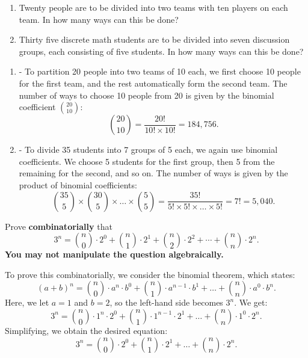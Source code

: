 \documentclass{article}
\theoremstyle{definition}
\begin{document}
\begin{question}
    \begin{enumerate}
	\item Twenty people are to be divided into two teams with ten players on each team.  
	In how many ways can this be done?
        \item Thirty five discrete math students are to be divided into seven discussion groups, each consisting of five students.  
        In how many ways can this be done?
   	\end{enumerate}
\end{question}
\begin{solution}
\begin{enumerate}
    \item 
    - To partition 20 people into two teams of 10 each, we first choose 10 people for the first team, and the rest automatically form the second team. The number of ways to choose 10 people from 20 is given by the binomial coefficient \( \binom{20}{10} \):
    \[ \binom{20}{10} = \frac{20!}{10! \times 10!} = 184,756. \]
    
    \item 
    - To divide 35 students into 7 groups of 5 each, we again use binomial coefficients. We choose 5 students for the first group, then 5 from the remaining for the second, and so on. The number of ways is given by the product of binomial coefficients:
    \[ \binom{35}{5} \times \binom{30}{5} \times \ldots \times \binom{5}{5} = \frac{35!}{5! \times 5! \times \ldots \times 5!} = 7! = 5,040. \]
\end{enumerate}
\end{solution}




\begin{question}
    Prove \textbf{combinatorially} that
    \[ 3^n = \binom{n}{0} \cdot 2^0 + \binom{n}{1}\cdot 2^1+ \binom{n}{2}\cdot 2^2+\cdots +\binom{n}{n}\cdot 2^n. \]
    \textbf{You may not manipulate the question algebraically.}
\end{question}
\begin{solution}
To prove this combinatorially, we consider the binomial theorem, which states:
\[ (a + b)^n = \binom{n}{0} \cdot a^n \cdot b^0 + \binom{n}{1} \cdot a^{n-1} \cdot b^1 + \ldots + \binom{n}{n} \cdot a^0 \cdot b^n. \]
Here, we let \(a = 1\) and \(b = 2\), so the left-hand side becomes \(3^n\). We get:
\[ 3^n = \binom{n}{0} \cdot 1^n \cdot 2^0 + \binom{n}{1} \cdot 1^{n-1} \cdot 2^1 + \ldots + \binom{n}{n} \cdot 1^0 \cdot 2^n. \]
Simplifying, we obtain the desired equation:
\[ 3^n = \binom{n}{0} \cdot 2^0 + \binom{n}{1} \cdot 2^1 + \ldots + \binom{n}{n} \cdot 2^n. \]
\end{solution}
\end{document}
